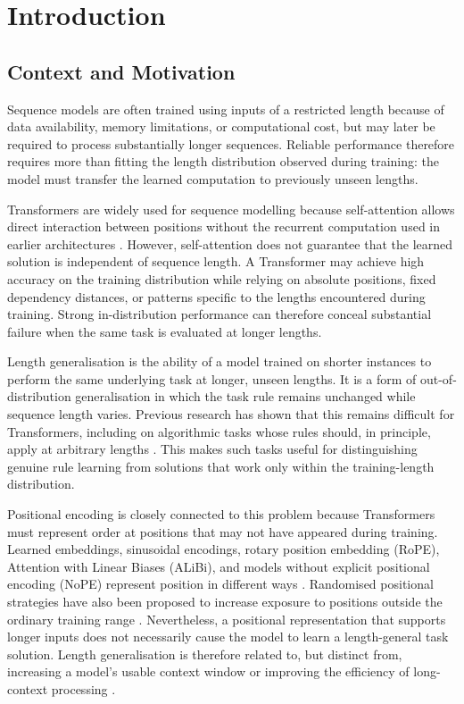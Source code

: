 \documentclass[
    author={Aanchala Ravindra Bhongade},
    supervisor={Dr. Fernando Moreno-Pino},
    degree={MSc},
    title={Length Generalisation in Transformer-Based Sequence Models: Failure Taxonomy and Mitigation Strategies},
    subtitle={},
    type={},
    year={2026}
]{dissertation}
\begin{document}

\chapter{Introduction}
\label{chap:introduction}

\section{Context and Motivation}

\noindent
Sequence models are often trained using inputs of a restricted length because of data availability, memory limitations, or computational cost, but may later be required to process substantially longer sequences. Reliable performance therefore requires more than fitting the length distribution observed during training: the model must transfer the learned computation to previously unseen lengths.

Transformers are widely used for sequence modelling because self-attention allows direct interaction between positions without the recurrent computation used in earlier architectures \cite{vaswani2017attention}. However, self-attention does not guarantee that the learned solution is independent of sequence length. A Transformer may achieve high accuracy on the training distribution while relying on absolute positions, fixed dependency distances, or patterns specific to the lengths encountered during training. Strong in-distribution performance can therefore conceal substantial failure when the same task is evaluated at longer lengths.

Length generalisation is the ability of a model trained on shorter instances to perform the same underlying task at longer, unseen lengths. It is a form of out-of-distribution generalisation in which the task rule remains unchanged while sequence length varies. Previous research has shown that this remains difficult for Transformers, including on algorithmic tasks whose rules should, in principle, apply at arbitrary lengths \cite{anil2022exploring,zhou2024algorithms}. This makes such tasks useful for distinguishing genuine rule learning from solutions that work only within the training-length distribution.

Positional encoding is closely connected to this problem because Transformers must represent order at positions that may not have appeared during training. Learned embeddings, sinusoidal encodings, rotary position embedding (RoPE), Attention with Linear Biases (ALiBi), and models without explicit positional encoding (NoPE) represent position in different ways \cite{vaswani2017attention,su2021roformer,press2022train,
kazemnejad2023impact}. Randomised positional strategies have also been proposed to increase exposure to positions outside the ordinary training range \cite{ruoss2023randomized}. Nevertheless, a positional representation that supports longer inputs does not necessarily cause the model to learn a length-general task solution. Length generalisation is therefore related to, but distinct from, increasing a model's usable context window or improving the efficiency of long-context processing
\cite{dai2019transformerxl,tay2021longrange}.
\end{document}

